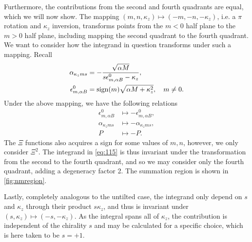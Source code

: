 Furthermore, the contributions from the second and fourth quadrants are equal, which we will now show.
The mapping \( (m,n, \kappa_z) \mapsto (-m, -n, -\kappa_z) \), i.e. a \( \pi \) rotation and \( \kappa_z \) inversion, transforms points from the \( m < 0 \) half plane to the \( m > 0 \) half plane, including mapping the second quadrant to the fourth quadrant.
We want to consider how the integrand in question transforms under such a mapping.
Recall
\begin{align*}
  \alpha_{\kappa_z m s} &= - \frac{\sqrt{\alpha M} }{s \epsilon_{m, \alpha B}^0 - \kappa_z},\\
  \epsilon_{m, \alpha B}^0 &= \operatorname{sign}(m) \sqrt{\alpha M + \kappa_z^2}, \quad m \neq 0.
\end{align*}
Under the above mapping, we have the following relations
\begin{align}
  \label{eq:117}
  \epsilon_{m, \alpha B}^0 &\mapsto -\epsilon_{m, \alpha B}^0,\\
  \alpha_{\kappa_z m s} &\mapsto -\alpha_{\kappa_z m s},\\
  P &\mapsto -P.
\end{align}
The \( \Xi \) functions also acquires a sign for some values of \( m,n \), however, we only consider \( \Xi^2 \).
The integrand in \cref{eq:115} is thus invariant under the transformation from the second to the fourth quadrant, and so we may consider only the fourth quadrant, adding a degeneracy factor 2.
The summation region is shown in \cref{fig:nmregion}.

Lastly, completely analogous to the untilted case, the integrand only depend on \( s \) and \( \kappa_z \) through their product \( s \kappa_z \), and thus is invariant under \( (s, \kappa_z) \mapsto (-s, -\kappa_z) \).
As the integral spans all of \( \kappa_z \), the contribution is independent of the chirality \( s \) and may be calculated for a specific choice, which is here taken to be \( s=+1 \).

